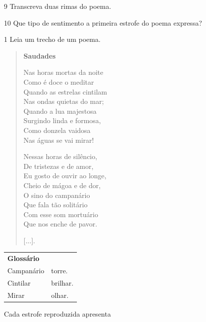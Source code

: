 \num{9} Transcreva duas rimas do poema.



\num{10} Que tipo de sentimento a primeira estrofe do poema expressa?




\num{1} Leia um trecho de um poema.

\begin{verse}
\textbf{Saudades}

Nas horas mortas da noite\\
Como é doce o meditar\\
Quando as estrelas cintilam\\
Nas ondas quietas do mar;\\
Quando a lua majestosa\\
Surgindo linda e formosa,\\
Como donzela vaidosa\\
Nas águas se vai mirar!

Nessas horas de silêncio,\\
De tristezas e de amor,\\
Eu gosto de ouvir ao longe,\\
Cheio de mágoa e de dor,\\
O sino do campanário\\
Que fala tão solitário\\
Com esse som mortuário\\
Que nos enche de pavor.

{[}...{]}.

\end{verse}

\begin{tabular}{ll}
\textbf{Glossário} & \mbox{}\\
Campanário & torre.\\
Cintilar & brilhar.\\
Mirar & olhar.
\end{tabular}

\bigskip

Cada estrofe reproduzida apresenta

